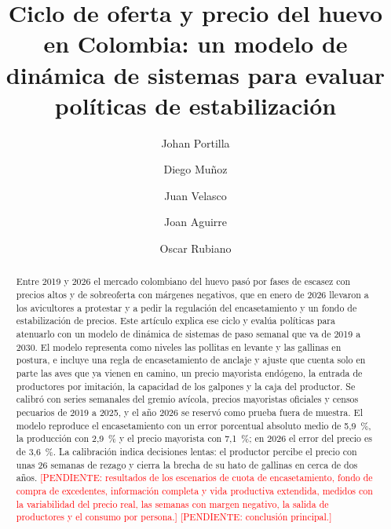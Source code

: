 \documentclass[preprint,12pt,authoryear]{elsarticle}
\newcommand{\pendiente}[1]{\textcolor{red}{[PENDIENTE: #1]}}
\begin{document}
\begin{frontmatter}

\title{Ciclo de oferta y precio del huevo en Colombia: un modelo de dinámica de sistemas para evaluar políticas de estabilización}

\author{Johan Portilla}
\author{Diego Muñoz}
\author{Juan Velasco}
\author{Joan Aguirre}
\author{Oscar Rubiano}


\begin{abstract}
Entre 2019 y 2026 el mercado colombiano del huevo pasó por fases de escasez con precios altos y de sobreoferta con márgenes negativos, que en enero de 2026 llevaron a los avicultores a protestar y a pedir la regulación del encasetamiento y un fondo de estabilización de precios. Este artículo explica ese ciclo y evalúa políticas para atenuarlo con un modelo de dinámica de sistemas de paso semanal que va de 2019 a 2030. El modelo representa como niveles las pollitas en levante y las gallinas en postura, e incluye una regla de encasetamiento de anclaje y ajuste que cuenta solo en parte las aves que ya vienen en camino, un precio mayorista endógeno, la entrada de productores por imitación, la capacidad de los galpones y la caja del productor. Se calibró con series semanales del gremio avícola, precios mayoristas oficiales y censos pecuarios de 2019 a 2025, y el año 2026 se reservó como prueba fuera de muestra. El modelo reproduce el encasetamiento con un error porcentual absoluto medio de 5,9~\%, la producción con 2,9~\% y el precio mayorista con 7,1~\%; en 2026 el error del precio es de 3,6~\%. La calibración indica decisiones lentas: el productor percibe el precio con unas 26 semanas de rezago y cierra la brecha de su hato de gallinas en cerca de dos años. \pendiente{resultados de los escenarios de cuota de encasetamiento, fondo de compra de excedentes, información completa y vida productiva extendida, medidos con la variabilidad del precio real, las semanas con margen negativo, la salida de productores y el consumo por persona.} \pendiente{conclusión principal.}


\end{abstract}
\end{frontmatter}
\end{document}
